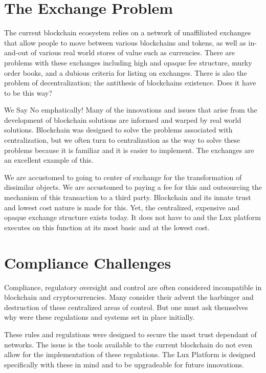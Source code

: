 \documentclass[11pt]{article}
\begin{document}
\section{The Exchange Problem}

The current blockchain ecosystem relies on a network of unaffiliated exchanges that allow people to move between various blockchains and tokens, as well as in-and-out of various real world stores of value such as currencies. There are problems with these exchanges including high and opaque fee structure, murky order books, and a dubious criteria for listing on exchanges. There is also the problem of decentralization; the antithesis of blockchains existence. Does it have to be this way?


We Say No emphatically! Many of the innovations and issues that arise from the development of blockchain solutions are informed and warped by real world solutions. Blockchain was designed to solve the problems associated with centralization, but we often turn to centralization as the way to solve these problems because it is familiar and it is easier to implement. The exchanges are an excellent example of this.


We are accustomed to going to center of exchange for the transformation of dissimilar objects. We are accustomed to paying a fee for this and outsourcing the mechanism of this transaction to a third party. Blockchain and its innate trust and lowest cost nature is made for this.  Yet, the centralized, expensive and opaque exchange structure exists today. It does not have to and the Lux platform executes on this function at its most basic and at the lowest cost.


\section{Compliance Challenges}

Compliance, regulatory oversight and control are often considered incompatible in blockchain and cryptocurrencies. Many consider their advent the harbinger and destruction of these centralized areas of control. But one must ask themselves why were these regulations and systems set in place initially.


These rules and regulations were designed to secure the most trust dependant of networks. The issue is the tools available to the current blockchain do not even allow for the implementation of these regulations. The Lux Platform is designed specifically with these in mind and to be upgradeable for future innovations.
\end{document}
